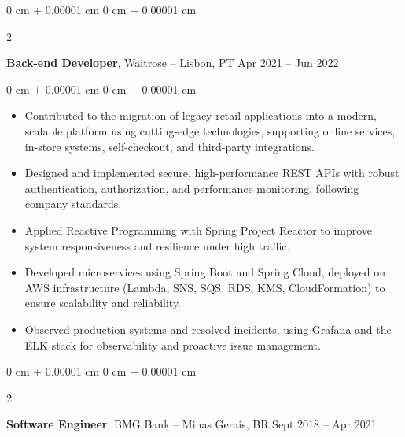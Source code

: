 \documentclass[10pt, letterpaper]{article}
\newenvironment{highlights}{
    \begin{itemize}[
        topsep=0.10 cm,
        parsep=0.10 cm,
        partopsep=0pt,
        itemsep=0pt,
        leftmargin=0 cm + 10pt
    ]
}{
    \end{itemize}
} %
\newenvironment{onecolentry}{
    \begin{adjustwidth}{
        0 cm + 0.00001 cm
    }{
        0 cm + 0.00001 cm
    }
}{
    \end{adjustwidth}
} %
\newenvironment{twocolentry}[2][]{
    \onecolentry
    \def\secondColumn{#2}
    \setcolumnwidth{\fill, 4.5 cm}
    \begin{paracol}{2}
}{
    \switchcolumn \raggedleft \secondColumn
    \end{paracol}
    \endonecolentry
} %
\begin{document}
        \vspace{0.2 cm}

        \begin{twocolentry}{
            Apr 2021 – Jun 2022
        }
            \textbf{Back-end Developer}, Waitrose -- Lisbon, PT\end{twocolentry}

        \vspace{0.10 cm}
        
        \begin{onecolentry}
            \begin{highlights}
                \item Contributed to the migration of legacy retail applications into a modern, scalable platform using cutting-edge technologies, supporting online services, in-store systems, self-checkout, and third-party integrations.
                \item Designed and implemented secure, high-performance REST APIs with robust authentication, authorization, and performance monitoring, following company standards.
                \item Applied Reactive Programming with Spring Project Reactor to improve system responsiveness and resilience under high traffic.
                \item Developed microservices using Spring Boot and Spring Cloud, deployed on AWS infrastructure (Lambda, SNS, SQS, RDS, KMS, CloudFormation) to ensure scalability and reliability.
                \item Observed production systems and resolved incidents, using Grafana and the ELK stack for observability and proactive issue management.
            \end{highlights}
        \end{onecolentry}
        
        \vspace{0.2 cm}
        
        \begin{twocolentry}{
            Sept 2018 – Apr 2021
        }
            \textbf{Software Engineer}, BMG Bank -- Minas Gerais, BR\end{twocolentry}

        \vspace{0.10 cm}
        
\end{document}
